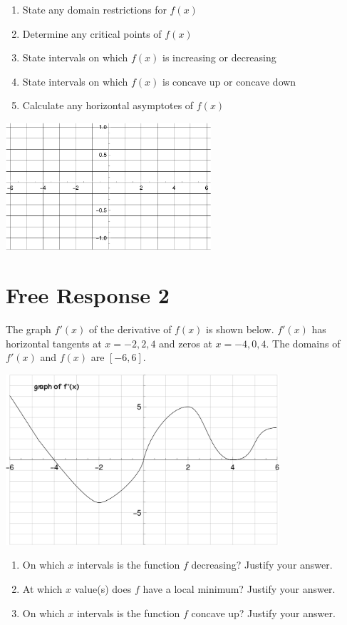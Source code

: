 \documentclass{article}
\begin{document}
\begin{enumerate}
	\setlength{\itemsep}{0.65in}
	\item State any domain restrictions for $f(x)$
	\item Determine any critical points of $f(x)$
	\item State intervals on which $f(x)$ is increasing or decreasing
	\item State intervals on which $f(x)$ is concave up or concave down
	\item Calculate any horizontal asymptotes of $f(x)$
\end{enumerate}
\vspace{0.5in}
\begin{center}
\includegraphics*[width=3in]{media/grid.png}
\end{center}

\clearpage
\section{Free Response 2}

The graph $f'(x)$  of the derivative of $f(x)$ is shown below. $f'(x)$ has horizontal tangents at $x=-2,2,4$ and zeros at $x=-4,0,4$.
The domains of $f'(x)$ and $f(x)$ are $[-6,6]$.

\begin{center}
	\includegraphics[width=4in]{media/g.png}
\end{center}

\begin{enumerate}
	\setlength{\itemsep}{1in}
	\item On which $x$ intervals is the function $f$ decreasing? Justify your answer.
	\item At which $x$ value(s) does $f$ have a local minimum? Justify your answer.
	\item On which $x$ intervals is the function $f$ concave up? Justify your answer.
\end{enumerate}
\end{document}
